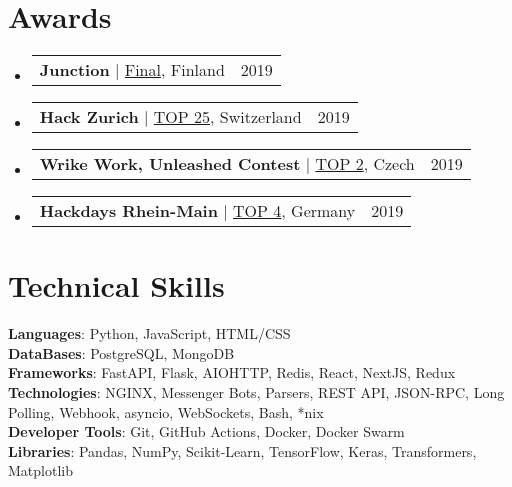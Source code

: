 \documentclass[letterpaper,11pt]{article}
\makeatletter
\newcommand{\resumeItem}[1]{
  \item\small{
    {#1 \vspace{-2pt}}
  }
}
\newcommand{\resumeProjectHeading}[2]{
    \item
    \begin{tabular*}{0.97\textwidth}{l@{\extracolsep{\fill}}r}
      \small#1 & #2 \\
    \end{tabular*}\vspace{-7pt}
}
\newcommand{\resumeSubHeadingListStart}{\begin{itemize}[leftmargin=0.15in, label={}]}
\newcommand{\resumeSubHeadingListEnd}{\end{itemize}}
\newcommand{\resumeItemListStart}{\begin{itemize}}
\newcommand{\resumeItemListEnd}{\end{itemize}\vspace{-5pt}}
\makeatother
\begin{document}
\section{Awards}
  \resumeSubHeadingListStart
    \resumeProjectHeading
        {\textbf{Junction} $|$ \underline{Final}, Finland}{2019}
    \resumeProjectHeading
        {\textbf{Hack Zurich} $|$ \underline{TOP 25}, Switzerland}{2019}
    \resumeProjectHeading
        {\textbf{Wrike Work, Unleashed Contest} $|$ \underline{TOP 2}, Czech}{2019}
    \resumeProjectHeading
        {\textbf{Hackdays Rhein-Main} $|$ \underline{TOP 4}, Germany}{2019}
  \resumeSubHeadingListEnd


\section{Technical Skills}
 \begin{itemize}[leftmargin=0.15in, label={}]
    \small{\item{
     \textbf{Languages}{: Python, JavaScript, HTML/CSS} \\
     \textbf{DataBases}{: PostgreSQL, MongoDB} \\
     \textbf{Frameworks}{: FastAPI, Flask, AIOHTTP, Redis, React, NextJS, Redux} \\
     \textbf{Technologies}{: NGINX, Messenger Bots, Parsers, REST API, JSON-RPC, Long Polling, Webhook, asyncio, WebSockets, Bash, *nix} \\
     \textbf{Developer Tools}{: Git, GitHub Actions, Docker, Docker Swarm} \\
     \textbf{Libraries}{: Pandas, NumPy, Scikit-Learn, TensorFlow, Keras, Transformers, Matplotlib}
    }}
 \end{itemize}


\end{document}
